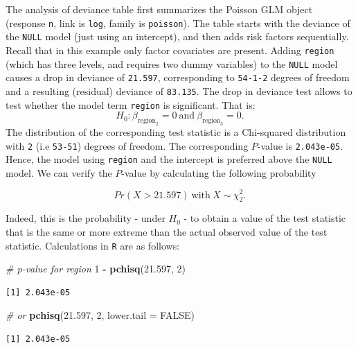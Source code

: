 \documentclass[
]{book}
\newenvironment{Shaded}{\begin{snugshade}}{\end{snugshade}}
\newcommand{\CommentTok}[1]{\textcolor[rgb]{0.56,0.35,0.01}{\textit{#1}}}
\newcommand{\DataTypeTok}[1]{\textcolor[rgb]{0.13,0.29,0.53}{#1}}
\newcommand{\DecValTok}[1]{\textcolor[rgb]{0.00,0.00,0.81}{#1}}
\newcommand{\FloatTok}[1]{\textcolor[rgb]{0.00,0.00,0.81}{#1}}
\newcommand{\KeywordTok}[1]{\textcolor[rgb]{0.13,0.29,0.53}{\textbf{#1}}}
\newcommand{\NormalTok}[1]{#1}
\newcommand{\OperatorTok}[1]{\textcolor[rgb]{0.81,0.36,0.00}{\textbf{#1}}}
\newcommand{\OtherTok}[1]{\textcolor[rgb]{0.56,0.35,0.01}{#1}}
\newcommand{\StringTok}[1]{\textcolor[rgb]{0.31,0.60,0.02}{#1}}
\begin{document}
The analysis of deviance table first summarizes the Poisson GLM object (response \texttt{n}, link is \texttt{log}, family is \texttt{poisson}). The table starts with the deviance of the \texttt{NULL} model (just using an intercept), and then adds risk factors sequentially. Recall that in this example only factor covariates are present. Adding \texttt{region} (which has three levels, and requires two dummy variables) to the \texttt{NULL} model causes a drop in deviance of \texttt{21.597}, corresponding to \texttt{54-1-2} degrees of freedom and a resulting (residual) deviance of \texttt{83.135}. The drop in deviance test allows to test whether the model term \texttt{region} is significant. That is:
\[ H_0: \beta_{\text{region}_2}=0\ \text{and}\ \beta_{\text{region}_3}=0. \]
The distribution of the corresponding test statistic is a Chi-squared distribution with \texttt{2} (i.e \texttt{53-51}) degrees of freedom. The corresponding \(P\)-value is \texttt{2.043e-05}. Hence, the model using \texttt{region} and the intercept is preferred above the \texttt{NULL} model. We can verify the \(P\)-value by calculating the following probability

\[ Pr(X > 21.597)\ \text{with}\ X \sim \chi^2_{2}.\]

Indeed, this is the probability - under \(H_0\) - to obtain a value of the test statistic that is the same or more extreme than the actual observed value of the test statistic. Calculations in \texttt{R} are as follows:

\begin{Shaded}
\begin{Highlighting}[]
\CommentTok{# p-value for region}
\DecValTok{1} \OperatorTok{-}\StringTok{ }\KeywordTok{pchisq}\NormalTok{(}\FloatTok{21.597}\NormalTok{, }\DecValTok{2}\NormalTok{)}
\end{Highlighting}
\end{Shaded}

\begin{verbatim}
[1] 2.043e-05
\end{verbatim}

\begin{Shaded}
\begin{Highlighting}[]
\CommentTok{# or}
\KeywordTok{pchisq}\NormalTok{(}\FloatTok{21.597}\NormalTok{, }\DecValTok{2}\NormalTok{, }\DataTypeTok{lower.tail =} \OtherTok{FALSE}\NormalTok{)}
\end{Highlighting}
\end{Shaded}

\begin{verbatim}
[1] 2.043e-05
\end{verbatim}
\end{document}
